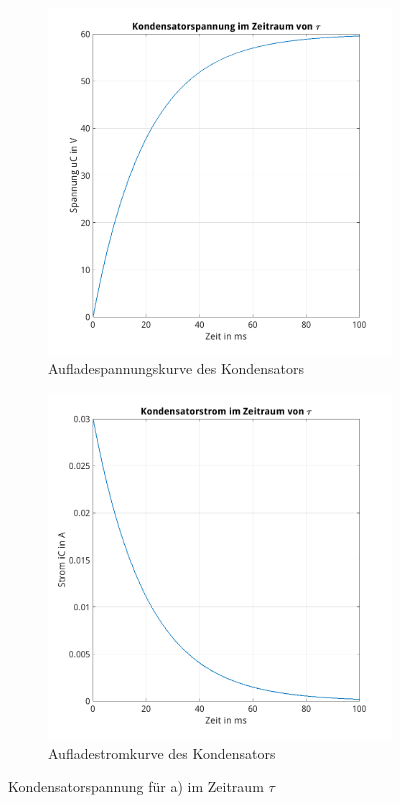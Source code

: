 \documentclass{article}
\begin{document}
\begin{figure}[h]
\centering
    \begin{subfigure}[b]{0.4\textwidth}
    \centering
    \includegraphics[width=\textwidth]{../assets/images/ET2P5/Kondensatorspannung11.png}
    \caption{Aufladespannungskurve des Kondensators}
  \end{subfigure}
  \hfill
  \begin{subfigure}[b]{0.4\textwidth}
    \centering
    \includegraphics[width=\textwidth]{../assets/images/ET2P5/Kondensatorstrom11.png}
    \caption{Aufladestromkurve des Kondensators}
  \end{subfigure}

  \caption{Kondensatorspannung für a) im Zeitraum $\tau$}
  \label{fig:con1}
\end{figure}
\end{document}
